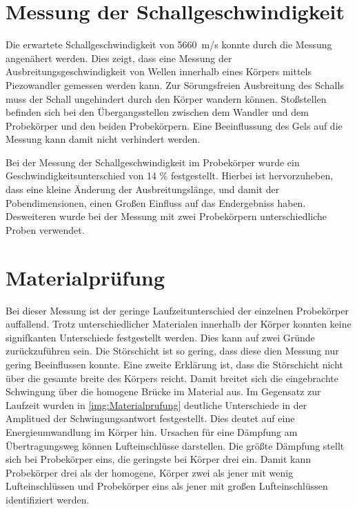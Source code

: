 \section{Messung der Schallgeschwindigkeit} 
Die erwartete Schallgeschwindigkeit von \SI{5660}{\meter/\second} konnte durch die Messung angenähert werden. Dies zeigt, dass eine Messung der Ausbreitungsgeschwindigkeit von Wellen innerhalb eines Körpers mittels Piezowandler gemessen werden kann.
Zur Sörungsfreien Ausbreitung des Schalls muss der Schall ungehindert durch den Körper wandern können. Stoßstellen befinden sich bei den Übergangsstellen zwischen dem Wandler und dem Probekörper und den beiden Probekörpern. Eine Beeinflussung des Gels auf die Messung kann damit nicht verhindert werden. 

Bei der Messung der Schallgeschwindigkeit im Probekörper wurde ein Geschwindigkeitsunterschied von 14 \% festgestellt. Hierbei ist hervorzuheben, dass eine kleine Änderung der Ausbreitungslänge, und damit der Pobendimensionen, einen Großen Einfluss auf das Endergebniss haben.
Desweiteren wurde bei der Messung mit zwei Probekörpern unterschiedliche Proben verwendet. 



\section{Materialprüfung}

Bei dieser Messung ist der geringe Laufzeitunterschied der einzelnen Probekörper auffallend. Trotz unterschiedlicher Materialen innerhalb der Körper konnten keine signifkanten Unterschiede festgestellt werden. Dies kann auf zwei Gründe zurückzuführen sein.
Die Störschicht ist so gering, dass diese dien Messung nur gering Beeinflussen konnte. Eine zweite Erklärung ist, dass die Störschicht nicht über die gesamte breite des Körpers reicht. Damit breitet sich die eingebrachte Schwingung über die homogene Brücke im Material aus.
Im Gegensatz zur Laufzeit wurden in \autoref{img:Materialprufung} deutliche Unterschiede in der Amplitued der Schwingungsantwort festgestellt. Dies deutet auf eine Energieumwandlung im Körper hin. 
Ursachen für eine Dämpfung am Übertragungsweg können Lufteinschlüsse darstellen. Die größte Dämpfung stellt sich bei Probekörper eins, die geringste bei Körper drei ein. 
Damit kann Probekörper drei als der homogene, Körper zwei als jener mit wenig Lufteinschlüssen und Probekörper eins als jener mit großen Lufteinschlüssen identifiziert werden.
